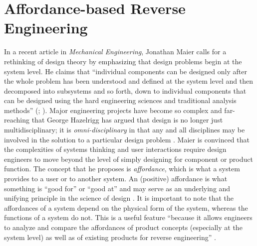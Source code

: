 \section{Affordance-based Reverse Engineering}

In a recent article in \textit{Mechanical Engineering}, Jonathan Maier
calls for a rethinking of design theory by emphasizing that design
problems begin at the system level. He claims that ``individual
components can be designed only after the whole problem has been
understood and defined at the system level and then decomposed into
subsystems and so forth, down to individual components that can be
designed using the hard engineering sciences and traditional analysis
methods'' (\citealp[p.~34]{maier2008}; \citealp{maier2011}). Major engineering projects have become so
complex and far-reaching that George Hazelrigg has argued that design
is no longer just multidisciplinary; it is \textit{omni-disciplinary}
in that any and all disciplines may be involved in the solution to a
particular design problem \citep{hazelrigg1996}. Maier is convinced that
the complexities of systems thinking and user interactions require
design engineers to move beyond the level of simply designing for
component or product function. The concept that he proposes is
\textit{affordance}, which is what a system provides to a user or to
another system. An (positive) affordance is what something is “good
for” or “good at” and may serve as an underlying and unifying
principle in the science of design \citep{maierfadel2001}. It is important
to note that the affordances of a system depend on the physical form of
the system, whereas the functions of a system do not. This is a useful
feature “because it allows engineers to analyze and compare the
affordances of product concepts (especially at the system level) as
well as of existing products for reverse
engineering” \citep[][p.~36]{maier2008}.

